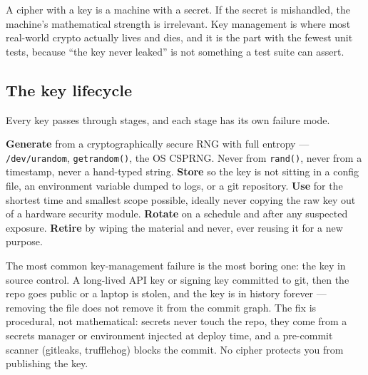 A cipher with a key is a machine with a secret. If the secret is mishandled, the
machine's mathematical strength is irrelevant. Key management is where most
real-world crypto actually lives and dies, and it is the part with the fewest unit
tests, because ``the key never leaked'' is not something a test suite can assert.

\subsection{The key lifecycle}

Every key passes through stages, and each stage has its own failure mode.

\begin{center}
\end{center}

\textbf{Generate} from a cryptographically secure RNG with full entropy ---
\texttt{/dev/urandom}, \texttt{getrandom()}, the OS CSPRNG. Never from
\texttt{rand()}, never from a timestamp, never a hand-typed string. \textbf{Store}
so the key is not sitting in a config file, an environment variable dumped to logs,
or a git repository. \textbf{Use} for the shortest time and smallest scope
possible, ideally never copying the raw key out of a hardware security module.
\textbf{Rotate} on a schedule and after any suspected exposure. \textbf{Retire} by
wiping the material and never, ever reusing it for a new purpose.

\begin{trapbox}
The most common key-management failure is the most boring one: the key in source
control. A long-lived API key or signing key committed to git, then the repo goes
public or a laptop is stolen, and the key is in history forever --- removing the
file does not remove it from the commit graph. The fix is procedural, not
mathematical: secrets never touch the repo, they come from a secrets manager or
environment injected at deploy time, and a pre-commit scanner (gitleaks,
trufflehog) blocks the commit. No cipher protects you from publishing the key.
\end{trapbox}

